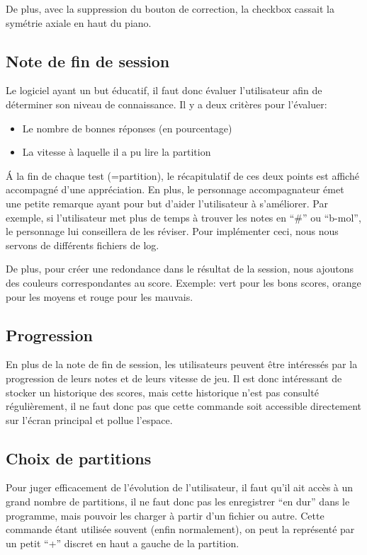 \documentclass{article}
\begin{document}
De plus, avec la suppression du bouton de correction, la checkbox cassait la symétrie axiale en haut du piano. 
\subsection{Note de fin de session}
Le logiciel ayant un but éducatif, il faut donc évaluer l'utilisateur afin de déterminer son niveau de connaissance.
Il y a deux critères pour l'évaluer:
\begin{itemize}
 \item Le nombre de bonnes réponses (en pourcentage)
 \item La vitesse à laquelle il a pu lire la partition
\end{itemize}
\'A la fin de chaque test (=partition), le récapitulatif de ces deux points est affiché accompagné d'une appréciation.
En plus, le personnage accompagnateur émet une petite remarque ayant pour but d'aider l'utilisateur à s'améliorer.
Par exemple, si l'utilisateur met plus de temps à trouver les notes en ``\#'' ou ``b-mol'', le personnage lui conseillera de les réviser.
Pour implémenter ceci, nous nous servons de différents fichiers de log.


De plus, pour créer une redondance dans le résultat de la session, nous ajoutons des couleurs correspondantes au score. Exemple: vert pour les bons scores,
orange pour les moyens et rouge pour les mauvais.
\subsection{Progression}
En plus de la note de fin de session, les utilisateurs peuvent être intéressés par la progression de leurs notes et de leurs vitesse
de jeu. Il est donc intéressant de stocker un historique des scores, mais cette historique n'est pas consulté régulièrement, il ne 
faut donc pas que cette commande soit accessible directement sur l'écran principal et pollue l'espace.
\subsection{Choix de partitions}
Pour juger efficacement de l'évolution de l'utilisateur, il faut qu'il ait accès à un grand nombre de partitions, il ne faut donc 
pas les enregistrer ``en dur'' dans le programme, mais pouvoir les charger à partir d'un fichier ou autre. Cette commande étant utilisée
 souvent (enfin normalement), on peut la représenté par un petit ``+'' discret en haut a gauche de la partition.
 
\end{document}
